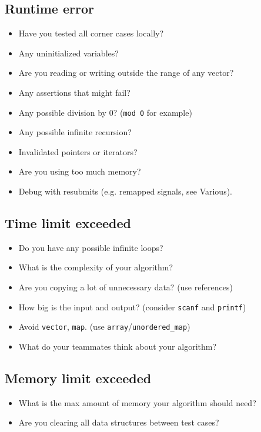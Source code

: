 \documentclass[12pt, a4paper, twoside]{article}
\begin{document}
\subsection{Runtime error}
\begin{itemize}
  \item Have you tested all corner cases locally?
  \item Any uninitialized variables?
  \item Are you reading or writing outside the range of any vector?
  \item Any assertions that might fail?
  \item Any possible division by 0? (\texttt{mod 0} for example)
  \item Any possible infinite recursion?
  \item Invalidated pointers or iterators?
  \item Are you using too much memory?
  \item Debug with resubmits (e.g. remapped signals, see Various).
\end{itemize}
\subsection{Time limit exceeded}
\begin{itemize}
  \item Do you have any possible infinite loops?
  \item What is the complexity of your algorithm?
  \item Are you copying a lot of unnecessary data? (use references)
  \item How big is the input and output? (consider \texttt{scanf} and \texttt{printf})
  \item Avoid \texttt{vector}, \texttt{map}. (use \texttt{array}/\texttt{unordered\_map})
  \item What do your teammates think about your algorithm?
\end{itemize}
\subsection{Memory limit exceeded}
\begin{itemize}
  \item What is the max amount of memory your algorithm should need?
  \item Are you clearing all data structures between test cases?
\end{itemize}
\end{document}
